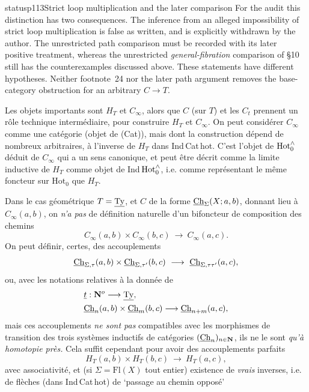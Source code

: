 \begin{dcomment}{status}{p113}{Strict loop multiplication and the later comparison}
For the audit this distinction has two consequences.  The inference from an alleged impossibility of strict loop multiplication is false as written, and is explicitly withdrawn by the author.  The unrestricted path comparison must be recorded with its later positive treatment, whereas the unrestricted \emph{general-fibration} comparison of \S10 still has the counterexamples discussed above.  These statements have different hypotheses.  Neither footnote~24 nor the later path argument removes the base-category obstruction for an arbitrary $C\to T$.
\end{dcomment}




Les objets importants sont $H_{T}$ et $C_{\infty}$, alors que $C$ (sur $T$) et les $C_{t}$ prennent un rôle technique intermédiaire, pour construire $H_{T}$ et $C_{\infty}$. On peut considérer $C_{\infty}$ comme une catégorie (objet de (Cat)), mais dont la construction dépend de nombreux arbitraires, à l'inverse de $H_{T}$ dans Ind\,Cat\,hot. C'est l'objet de $\mathrm{Hot}^{\wedge}_{0}$ déduit de $C_{\infty}$ qui a un sens canonique, et peut être décrit comme la limite inductive de $H_{T}$ comme objet de Ind\,$\mathrm{Hot}^{\wedge}_{0}$, i.e. comme représentant le même foncteur sur $\mathrm{Hot}_{0}$ que $H_{T}$.

Dans le cas géométrique $T = \underline{\mathrm{Ty}}$, et $C$ de la forme $\underline{\mathrm{Ch}}_{\Sigma}(X;a,b)$, donnant lieu à $C_{\infty}(a,b)$, on \textit{n'a pas} de définition naturelle d'un bifoncteur de composition des chemins
\[
C_{\infty}(a,b) \times C_{\infty}(b,c) \ \longrightarrow\ C_{\infty}(a,c).
\]
On peut définir, certes, des accouplements
\[
\Ch_{\Sigma,\tau}(a,b) \times \Ch_{\Sigma,\tau'}(b,c) \ \longrightarrow\ \Ch_{\Sigma,\tau\tau'}(a,c),
\]
ou, avec les notations relatives à la donnée de
\[
\begin{aligned}
&\underline{t} : \mathbf{N}^{o} \longrightarrow \underline{\mathrm{Ty}},\\
&\underline{\mathrm{Ch}}_{n}(a,b) \times \underline{\mathrm{Ch}}_{m}(b,c) \longrightarrow \underline{\mathrm{Ch}}_{n+m}(a,c),
\end{aligned}
\]
mais ces accouplements \textit{ne sont pas} compatibles avec les morphismes de transition des trois systèmes inductifs de catégories $(\underline{\mathrm{Ch}}_{n})_{n\in\mathbf{N}}$, ils ne le sont \textit{qu'à homotopie près.} Cela suffit cependant pour avoir des accouplements parfaits
\[
H_{T}(a,b) \times H_{T}(b,c) \ \longrightarrow\ H_{T}(a,c),
\]
avec associativité, et (si $\Sigma = \mathrm{Fl}(X)$ tout entier) existence de \textit{vrais} inverses, i.e. de flèches (dans Ind\,Cat\,hot) de `passage au chemin opposé'

